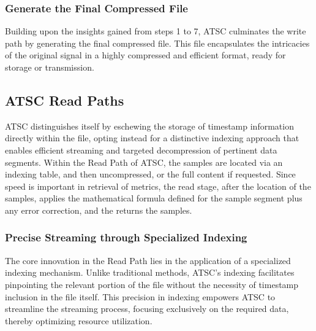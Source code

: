 \documentclass[conference]{IEEEtran}
\begin{document}
\vspace{10pt}
\subsubsection{Generate the Final Compressed File}
Building upon the insights gained from steps 1 to 7, ATSC culminates the write path by generating the final compressed file. This file encapsulates the intricacies of the original signal in a highly compressed and efficient format, ready for storage or transmission.


\subsection{ATSC Read Paths}

ATSC distinguishes itself by eschewing the storage of timestamp information directly within the file, opting instead for a distinctive indexing approach that enables efficient streaming and targeted decompression of pertinent data segments.
Within the Read Path of ATSC, the samples are located via an indexing table, and then uncompressed, or the full content if requested. 
Since speed is important in retrieval of metrics, the read stage, after the location of the samples, applies the mathematical formula defined for the sample segment plus any error correction, and the returns the samples. 

\vspace{10pt}
\subsubsection{Precise Streaming through Specialized Indexing}\label{SCMA}
The core innovation in the Read Path lies in the application of a specialized indexing mechanism. Unlike traditional methods, ATSC's indexing facilitates pinpointing the relevant portion of the file without the necessity of timestamp inclusion in the file itself. This precision in indexing empowers ATSC to streamline the streaming process, focusing exclusively on the required data, thereby optimizing resource utilization. 

\vspace{10pt}
\end{document}
